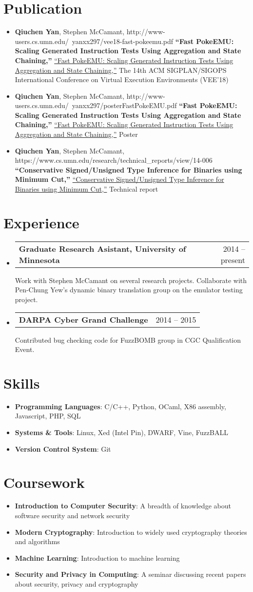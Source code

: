 \documentclass[letterpaper,11pt]{article}
\makeatletter
\newcommand{\brief}[2]{
  \item[]\small{
    \textbf{#1}{: #2 \vspace{-2pt}}
  }
}
\newcommand{\project}[3]{
  \vspace{-1pt}\item[]
  \begin{tabular*}{0.97\textwidth}{l@{\extracolsep{\fill}}r}
  \textbf{\small#1} & {\small#2}\\
  \end{tabular*}
      {\small#3}\vspace{-5pt}
}
\newcommand{\bib}[4]{
  \vspace{-1pt}\item[]
      {\small#2},
      \ifx\hfuzz#4\hfuzz
      \textbf{\small``#1,''}      
      \else
      \href{#4}{\small``#1,''}
      \fi      
      \small{#3}
    \vspace{-2pt}
}
\newcommand{\content}{\begin{itemize}[leftmargin=0px]}
\newcommand{\contentend}{\end{itemize}}
\makeatother
\begin{document}
%
\section{Publication}
	\content
    \bib
      {Fast PokeEMU: Scaling Generated Instruction Tests Using 
      Aggregation and State Chaining}
      {\textbf{Qiuchen Yan}, Stephen McCamant}
      {The 14th ACM SIGPLAN/SIGOPS International Conference on Virtual Execution Environments (VEE'18)}
      {http://www-users.cs.umn.edu/~yanxx297/vee18-fast-pokeemu.pdf}
    \bib
      {Fast PokeEMU: Scaling Generated Instruction Tests Using 
      Aggregation and State Chaining}
      {\textbf{Qiuchen Yan}, Stephen McCamant}
      {Poster}
      {http://www-users.cs.umn.edu/~yanxx297/posterFastPokeEMU.pdf}     
    \bib
      {Conservative Signed/Unsigned Type Inference for Binaries
      using Minimum Cut}
      {\textbf{Qiuchen Yan}, Stephen McCamant}
      {Technical report}
      {https://www.cs.umn.edu/research/technical_reports/view/14-006}             
  \contentend         

%
\section{Experience}
  \content
  \project
      {Graduate Research Asistant, University of Minnesota}{2014 -- present}
      {Work with Stephen McCamant on several research projects. 
      Collaborate with Pen-Chung Yew's dynamic binary translation group on the emulator testing project.}    
    \project
      {DARPA Cyber Grand Challenge}{2014 -- 2015}
      {Contributed bug checking code for FuzzBOMB group in CGC Qualification Event.}  
  \contentend
  
  
%
\section{Skills}	
 \content
  \brief
    {Programming Languages}
    {C/C++, Python, OCaml, X86 assembly, Javascript, PHP, SQL} 
  \brief
    {Systems \& Tools}
    {Linux, Xed (Intel Pin), DWARF, Vine, FuzzBALL}
  \brief
    {Version Control System}{Git}
 \contentend

%
\section{Coursework}
  \content
    \brief
      {Introduction to Computer Security}
      {A breadth of knowledge about software security and network security}   
    \brief
      {Modern Cryptography}
      {Introduction to widely used cryptography theories and algorithms}
    \brief
      {Machine Learning}
      {Introduction to machine learning}      
    \brief
      {Security and Privacy in Computing}
      {A seminar discussing recent papers about security, privacy and cryptography}
  \contentend  
\end{document}
